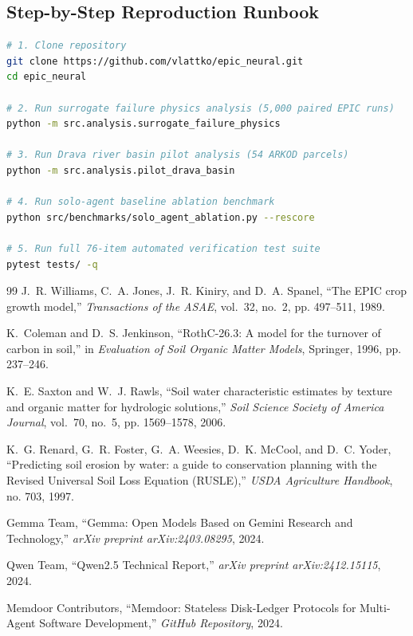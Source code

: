 \documentclass[11pt,a4paper]{article}
\begin{document}
\subsection{Step-by-Step Reproduction Runbook}
\begin{lstlisting}[language=bash]
# 1. Clone repository
git clone https://github.com/vlattko/epic_neural.git
cd epic_neural

# 2. Run surrogate failure physics analysis (5,000 paired EPIC runs)
python -m src.analysis.surrogate_failure_physics

# 3. Run Drava river basin pilot analysis (54 ARKOD parcels)
python -m src.analysis.pilot_drava_basin

# 4. Run solo-agent baseline ablation benchmark
python src/benchmarks/solo_agent_ablation.py --rescore

# 5. Run full 76-item automated verification test suite
pytest tests/ -q
\end{lstlisting}

\begin{thebibliography}{99}
J.~R. Williams, C.~A. Jones, J.~R. Kiniry, and D.~A. Spanel, ``The EPIC crop growth model,'' \emph{Transactions of the ASAE}, vol.~32, no.~2, pp. 497--511, 1989.

K.~Coleman and D.~S. Jenkinson, ``RothC-26.3: A model for the turnover of carbon in soil,'' in \emph{Evaluation of Soil Organic Matter Models}, Springer, 1996, pp. 237--246.

K.~E. Saxton and W.~J. Rawls, ``Soil water characteristic estimates by texture and organic matter for hydrologic solutions,'' \emph{Soil Science Society of America Journal}, vol.~70, no.~5, pp. 1569--1578, 2006.

K.~G. Renard, G.~R. Foster, G.~A. Weesies, D.~K. McCool, and D.~C. Yoder, ``Predicting soil erosion by water: a guide to conservation planning with the Revised Universal Soil Loss Equation (RUSLE),'' \emph{USDA Agriculture Handbook}, no. 703, 1997.

Gemma Team, ``Gemma: Open Models Based on Gemini Research and Technology,'' \emph{arXiv preprint arXiv:2403.08295}, 2024.

Qwen Team, ``Qwen2.5 Technical Report,'' \emph{arXiv preprint arXiv:2412.15115}, 2024.

Memdoor Contributors, ``Memdoor: Stateless Disk-Ledger Protocols for Multi-Agent Software Development,'' \emph{GitHub Repository}, 2024.
\end{thebibliography}
\end{document}
